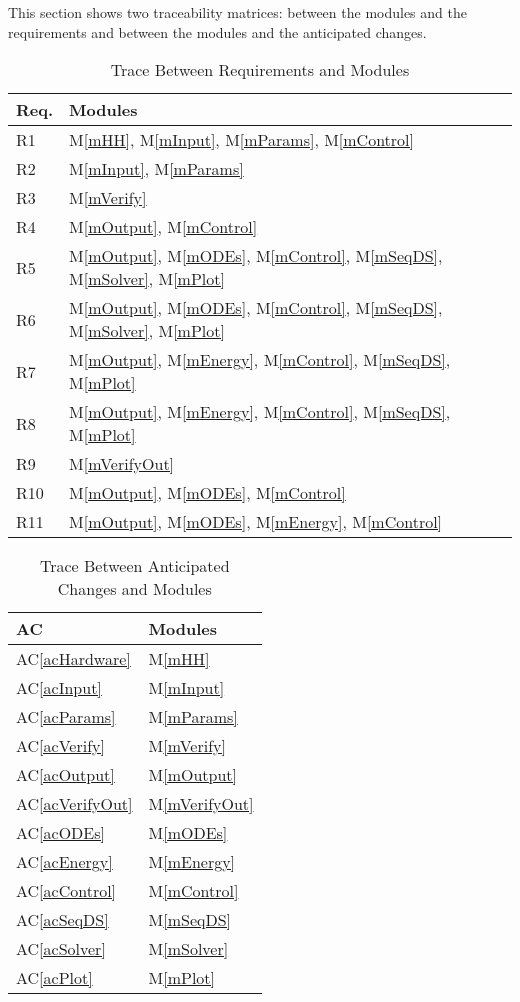 \documentclass[12pt, titlepage]{article}
\newcommand{\acref}[1]{AC\ref{#1}}
\newcommand{\mref}[1]{M\ref{#1}}
\begin{document}
This section shows two traceability matrices: between the modules and the
requirements and between the modules and the anticipated changes.

\begin{table}[H]
\centering
\begin{tabular}{p{} p{}}
\toprule
\textbf{Req.} & \textbf{Modules}\\
\midrule
R1 & \mref{mHH}, \mref{mInput}, \mref{mParams}, \mref{mControl}\\
R2 & \mref{mInput}, \mref{mParams}\\
R3 & \mref{mVerify}\\
R4 & \mref{mOutput}, \mref{mControl}\\
R5 & \mref{mOutput}, \mref{mODEs}, \mref{mControl}, \mref{mSeqDS}, \mref{mSolver}, \mref{mPlot}\\
R6 & \mref{mOutput}, \mref{mODEs}, \mref{mControl}, \mref{mSeqDS}, \mref{mSolver}, \mref{mPlot}\\
R7 & \mref{mOutput}, \mref{mEnergy}, \mref{mControl}, \mref{mSeqDS}, \mref{mPlot}\\
R8 & \mref{mOutput}, \mref{mEnergy}, \mref{mControl}, \mref{mSeqDS}, \mref{mPlot}\\
R9 & \mref{mVerifyOut}\\
R10 & \mref{mOutput}, \mref{mODEs}, \mref{mControl}\\
R11 & \mref{mOutput}, \mref{mODEs}, \mref{mEnergy}, \mref{mControl}\\
\bottomrule
\end{tabular}
\caption{Trace Between Requirements and Modules}
\label{TblRT}
\end{table}

\begin{table}[H]
\centering
\begin{tabular}{p{} p{}}
\toprule
\textbf{AC} & \textbf{Modules}\\
\midrule
\acref{acHardware} & \mref{mHH}\\
\acref{acInput} & \mref{mInput}\\
\acref{acParams} & \mref{mParams}\\
\acref{acVerify} & \mref{mVerify}\\
\acref{acOutput} & \mref{mOutput}\\
\acref{acVerifyOut} & \mref{mVerifyOut}\\
\acref{acODEs} & \mref{mODEs}\\
\acref{acEnergy} & \mref{mEnergy}\\
\acref{acControl} & \mref{mControl}\\
\acref{acSeqDS} & \mref{mSeqDS}\\
\acref{acSolver} & \mref{mSolver}\\
\acref{acPlot} & \mref{mPlot}\\
\bottomrule
\end{tabular}
\caption{Trace Between Anticipated Changes and Modules}
\label{TblACT}
\end{table}
\end{document}
